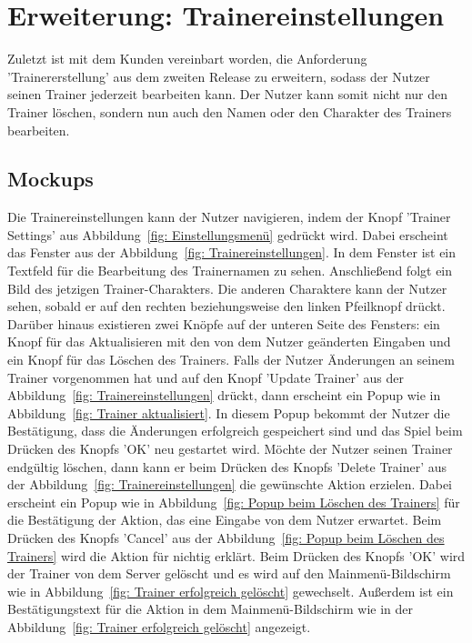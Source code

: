 \section{Erweiterung: Trainereinstellungen}\label{sec:trainer-settings}
Zuletzt ist mit dem Kunden vereinbart worden, die Anforderung 'Trainererstellung' aus dem zweiten Release zu erweitern, sodass der Nutzer seinen Trainer jederzeit bearbeiten kann. Der Nutzer kann somit nicht nur den Trainer löschen, sondern nun auch den Namen oder den Charakter des Trainers bearbeiten.
\subsection{Mockups}\label{subsec:mockups-trainer-settings}
Die Trainereinstellungen kann der Nutzer navigieren, indem der Knopf 'Trainer Settings' aus Abbildung~\ref{fig: Einstellungsmenü} gedrückt wird. Dabei erscheint das Fenster aus der Abbildung~\ref{fig: Trainereinstellungen}. In dem Fenster ist ein Textfeld für die Bearbeitung des Trainernamen zu sehen. Anschließend folgt ein Bild des jetzigen Trainer-Charakters. Die anderen Charaktere kann der Nutzer sehen, sobald er auf den rechten beziehungsweise den linken Pfeilknopf drückt. Darüber hinaus existieren zwei Knöpfe auf der unteren Seite des Fensters: ein Knopf für das Aktualisieren mit den von dem Nutzer geänderten Eingaben und ein Knopf für das Löschen des Trainers.
Falls der Nutzer Änderungen an seinem Trainer vorgenommen hat und auf den Knopf 'Update Trainer' aus der Abbildung~\ref{fig: Trainereinstellungen} drückt, dann erscheint ein Popup wie in Abbildung~\ref{fig: Trainer aktualisiert}. In diesem Popup bekommt der Nutzer die Bestätigung, dass die Änderungen erfolgreich gespeichert sind und das Spiel beim Drücken des Knopfs 'OK' neu gestartet wird.
Möchte der Nutzer seinen Trainer endgültig löschen, dann kann er beim Drücken des Knopfs 'Delete Trainer' aus der Abbildung~\ref{fig: Trainereinstellungen} die gewünschte Aktion erzielen. Dabei erscheint ein Popup wie in Abbildung~\ref{fig: Popup beim Löschen des Trainers} für die Bestätigung der Aktion, das eine Eingabe von dem Nutzer erwartet. Beim Drücken des Knopfs 'Cancel' aus der Abbildung~\ref{fig: Popup beim Löschen des Trainers} wird die Aktion für nichtig erklärt. Beim Drücken des Knopfs 'OK' wird der Trainer von dem Server gelöscht und es wird auf den Mainmenü-Bildschirm wie in Abbildung~\ref{fig: Trainer erfolgreich gelöscht} gewechselt. Außerdem ist ein Bestätigungstext für die Aktion in dem Mainmenü-Bildschirm wie in der Abbildung~\ref{fig: Trainer erfolgreich gelöscht} angezeigt.
